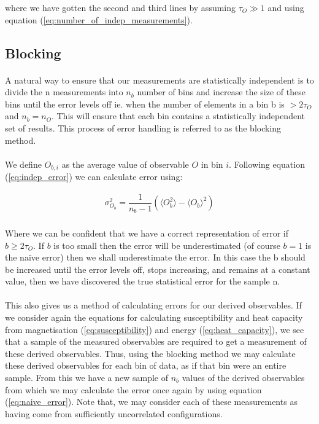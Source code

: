 \documentclass[12pt] {report} %
\begin{document}
			where we have gotten the second and third lines by assuming $\tau_O \gg 1$ and using equation (\ref{eq:number_of_indep_measurements}).

			\subsection{Blocking}	\label{sec:blocking}
			
				\paragraph{}
					A natural way to ensure that our measurements are statistically independent is to divide the n measurements into $ n_b $ number of bins and increase the size of these bins until the error levels off ie. when the number of elements in a bin b is $> 2 \tau_O$ and $n_b = n_O$. This will ensure that each bin contains a statistically independent set of results. This process of error handling is referred to as the blocking method.
					
				\paragraph{}
					We define $ O_{b,i} $ as the average value of observable $ O $ in bin $ i $. Following equation (\ref{eq:indep_error}) we can calculate error using:
					
				\begin{align}
					\sigma_{O_b}^2 = \dfrac{1}{n_b-1} (\langle O_b^2 \rangle - \langle O_b \rangle^2) \label{eq:error_bins}
				\end{align}
				
			\paragraph{}
				Where we can be confident that we have a correct representation of error if $b \geq 2 \tau_O$. If $ b $ is too small then the error will be underestimated (of course $ b = 1 $ is the na\"{i}ve error) then we shall underestimate the error. In this case the b should be increased until the error levels off, stops increasing, and remains at a constant value, then we have discovered the true statistical error for the sample n.
				
			\paragraph{}
				This also gives us a method of calculating errors for our derived observables. If we consider again the equations for calculating susceptibility and heat capacity from magnetisation (\ref{eq:susceptibility}) and energy (\ref{eq:heat_capacity}), we see that a sample of the measured observables are required to get a measurement of these derived observables. Thus, using the blocking method we may calculate these derived observables for each bin of data, as if that bin were an entire sample. From this we have a new sample of $n_b$ values of the derived observables from which we may calculate the error once again by using equation (\ref{eq:naive_error}). Note that, we may consider each of these measurements as having come from sufficiently uncorrelated configurations.
				
\end{document}
